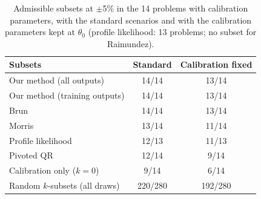 \begin{table}[H]
\centering\small
\caption{Admissible subsets at $\pm$5\% in the 14 problems with calibration parameters, with the standard scenarios and with the calibration parameters kept at $\theta_0$ (profile likelihood: 13 problems; no subset for Raimundez).}\label{tab:calfixedcrit}
\begin{tabular}{@{}lcc@{}}
\toprule
Subsets & Standard & Calibration fixed \\
\midrule
Our method (all outputs) & 14/14 & 13/14 \\
Our method (training outputs) & 14/14 & 13/14 \\
Brun & 14/14 & 13/14 \\
Morris & 13/14 & 11/14 \\
Profile likelihood & 12/13 & 11/13 \\
Pivoted QR & 12/14 & 9/14 \\
Calibration only ($k=0$) & 9/14 & 6/14 \\
Random $k$-subsets (all draws) & 220/280 & 192/280 \\
\bottomrule
\end{tabular}
\end{table}
